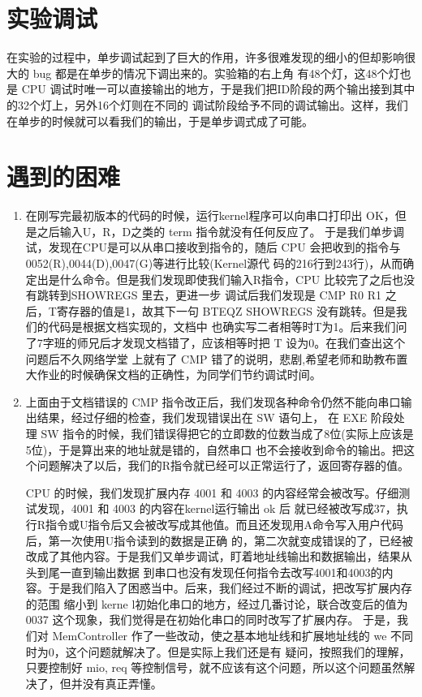 \documentclass[10pt]{article}
\begin{document}
\begin{CJK}{UTF8}{gbsn}
\section{实验调试}
在实验的过程中，单步调试起到了巨大的作用，许多很难发现的细小的但却影响很大的 bug 都是在单步的情况下调出来的。实验箱的右上角
有48个灯，这48个灯也是 CPU 调试时唯一可以直接输出的地方，于是我们把ID阶段的两个输出接到其中的32个灯上，另外16个灯则在不同的
调试阶段给予不同的调试输出。这样，我们在单步的时候就可以看我们的输出，于是单步调式成了可能。

\section{遇到的困难}
\begin{enumerate}
\item 在刚写完最初版本的代码的时候，运行kernel程序可以向串口打印出 OK，但是之后输入U，R，D之类的 term 指令就没有任何反应了。
于是我们单步调试，发现在CPU是可以从串口接收到指令的，随后 CPU 会把收到的指令与0052(R),0044(D),0047(G)等进行比较(Kernel源代
码的216行到243行)，从而确定出是什么命令。但是我们发现即使我们输入R指令，CPU 比较完了之后也没有跳转到SHOWREGS 里去，更进一步
调试后我们发现是 CMP R0 R1 之后，T寄存器的值是1，故其下一句 BTEQZ SHOWREGS 没有跳转。但是我们的代码是根据文档实现的，文档中
也确实写二者相等时T为1。后来我们问了7字班的师兄后才发现文档错了，应该相等时把 T 设为0。在我们查出这个问题后不久网络学堂
上就有了 CMP 错了的说明，悲剧,希望老师和助教布置大作业的时候确保文档的正确性，为同学们节约调试时间。

\item 上面由于文档错误的 CMP 指令改正后，我们发现各种命令仍然不能向串口输出结果，经过仔细的检查，我们发现错误出在 SW 语句上，
在 EXE 阶段处理 SW 指令的时候，我们错误得把它的立即数的位数当成了8位(实际上应该是5位)，于是算出来的地址就是错的，自然串口
也不会接收到命令的输出。把这个问题解决了以后，我们的R指令就已经可以正常运行了，返回寄存器的值。

 CPU 的时候，我们发现扩展内存 4001 和 4003 的内容经常会被改写。仔细测试发现，4001 和 4003 的内容在kernel运行输出 ok 后
就已经被改写成37，执行R指令或U指令后又会被改写成其他值。而且还发现用A命令写入用户代码后，第一次使用U指令读到的数据是正确
的，第二次就变成错误的了，已经被改成了其他内容。于是我们又单步调试，盯着地址线输出和数据输出，结果从头到尾一直到输出数据
到串口也没有发现任何指令去改写4001和4003的内容。于是我们陷入了困惑当中。后来，我们经过不断的调试，把改写扩展内存的范围
缩小到 kerne l初始化串口的地方，经过几番讨论，联合改变后的值为 0037 这个现象，我们觉得是在初始化串口的同时改写了扩展内存。
于是，我们对 MemController 作了一些改动，使之基本地址线和扩展地址线的 we 不同时为0，这个问题就解决了。但是实际上我们还是有
疑问，按照我们的理解，只要控制好 mio, req 等控制信号，就不应该有这个问题，所以这个问题虽然解决了，但并没有真正弄懂。


\end{enumerate}
\end{CJK}
\end{document}
